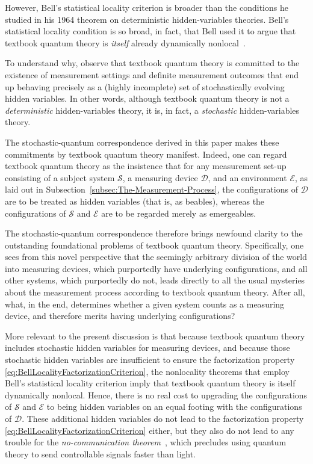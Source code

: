 \documentclass[12pt,english,prl,superscriptaddress,nobibnotes,nofootinbib]{revtex4-2}
\begin{document}
However, Bell's statistical locality criterion is broader than the
conditions he studied in his 1964 theorem on deterministic hidden-variables
theories. Bell's statistical locality condition is so broad, in fact,
that Bell used it to argue that textbook quantum theory is \emph{itself}
already dynamically nonlocal~\citep{Bell:1975ttolb,Bell:1990lnc}.

To understand why, observe that textbook quantum theory is committed
to the existence of measurement settings and definite measurement
outcomes that end up behaving precisely as a (highly incomplete) set
of stochastically evolving hidden variables. In other words, although
textbook quantum theory is not a \emph{deterministic} hidden-variables
theory, it is, in fact, a \emph{stochastic} hidden-variables theory.

The stochastic-quantum correspondence derived in this paper makes
these commitments by textbook quantum theory manifest. Indeed, one
can regard textbook quantum theory as the insistence that for any
measurement set-up consisting of a subject system $\mathcal{S}$,
a measuring device $\mathcal{D}$, and an environment $\mathcal{E}$,
as laid out in Subsection~\ref{subsec:The-Measurement-Process},
the configurations of $\mathcal{D}$ are to be treated as hidden variables
(that is, as beables), whereas the configurations of $\mathcal{S}$
and $\mathcal{E}$ are to be regarded merely as emergeables.

The stochastic-quantum correspondence therefore brings newfound clarity
to the outstanding foundational problems of textbook quantum theory.
Specifically, one sees from this novel perspective that the seemingly
arbitrary division of the world into measuring devices, which purportedly
have underlying configurations, and all other systems, which purportedly
do not, leads directly to all the usual mysteries about the measurement
process according to textbook quantum theory. After all, what, in
the end, determines whether a given system counts as a measuring device,
and therefore merits having underlying configurations?

More relevant to the present discussion is that because textbook quantum
theory includes stochastic hidden variables for measuring devices,
and because those stochastic hidden variables are insufficient to
ensure the factorization property \eqref{eq:BellLocalityFactorizationCriterion},
the nonlocality theorems that employ Bell's statistical locality criterion
imply that textbook quantum theory is itself dynamically nonlocal.
Hence, there is no real cost to upgrading the configurations of $\mathcal{S}$
and $\mathcal{E}$ to being hidden variables on an equal footing with
the configurations of $\mathcal{D}$. These additional hidden variables
do not lead to the factorization property \eqref{eq:BellLocalityFactorizationCriterion}
either, but they also do not lead to any trouble for the \emph{no-communication theorem}~\citep{GhirardiRiminiWeber:1980agaastttqmmp,Jordan:1983qcdnts},
which precludes using quantum theory to send controllable signals
faster than light.
\end{document}
